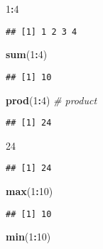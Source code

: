 \documentclass[]{article}
\newenvironment{Shaded}{\begin{snugshade}}{\end{snugshade}}
\newcommand{\KeywordTok}[1]{\textcolor[rgb]{0.13,0.29,0.53}{\textbf{#1}}}
\newcommand{\DecValTok}[1]{\textcolor[rgb]{0.00,0.00,0.81}{#1}}
\newcommand{\CommentTok}[1]{\textcolor[rgb]{0.56,0.35,0.01}{\textit{#1}}}
\newcommand{\OperatorTok}[1]{\textcolor[rgb]{0.81,0.36,0.00}{\textbf{#1}}}
\newcommand{\NormalTok}[1]{#1}
\begin{document}
\begin{Shaded}
\begin{Highlighting}[]
\DecValTok{1}\OperatorTok{:}\DecValTok{4}
\end{Highlighting}
\end{Shaded}

\begin{verbatim}
## [1] 1 2 3 4
\end{verbatim}

\begin{Shaded}
\begin{Highlighting}[]
\KeywordTok{sum}\NormalTok{(}\DecValTok{1}\OperatorTok{:}\DecValTok{4}\NormalTok{)}
\end{Highlighting}
\end{Shaded}

\begin{verbatim}
## [1] 10
\end{verbatim}

\begin{Shaded}
\begin{Highlighting}[]
\KeywordTok{prod}\NormalTok{(}\DecValTok{1}\OperatorTok{:}\DecValTok{4}\NormalTok{) }\CommentTok{# product}
\end{Highlighting}
\end{Shaded}

\begin{verbatim}
## [1] 24
\end{verbatim}

\begin{Shaded}
\begin{Highlighting}[]
\DecValTok{24}
\end{Highlighting}
\end{Shaded}

\begin{verbatim}
## [1] 24
\end{verbatim}

\begin{Shaded}
\begin{Highlighting}[]
\KeywordTok{max}\NormalTok{(}\DecValTok{1}\OperatorTok{:}\DecValTok{10}\NormalTok{)}
\end{Highlighting}
\end{Shaded}

\begin{verbatim}
## [1] 10
\end{verbatim}

\begin{Shaded}
\begin{Highlighting}[]
\KeywordTok{min}\NormalTok{(}\DecValTok{1}\OperatorTok{:}\DecValTok{10}\NormalTok{)}
\end{Highlighting}
\end{Shaded}
\end{document}
